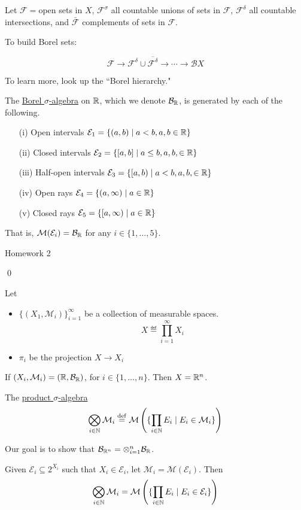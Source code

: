 \documentclass[x11names,reqno,14pt]{extarticle}
\begin{document}
Let $\mathcal{F} = $open sets in $X$, $\mathcal{F}^\sigma$ all countable unions of sets in $\mathcal{F}$, $\mathcal{F}^\delta$ all countable intersections, and $\bar{\mathcal{F}}$ complements of sets in $\mathcal{F}$. 

To build Borel sets: 

\[
\mathcal{F}\to\mathcal{F}^\delta \cup \overline{\mathcal{F}^\delta} \to\cdots \to \mathcal{B}X
\]

To learn more, look up the ``Borel hierarchy." 

\prop The \underline{Borel $\sigma$-algebra} on $\mathbb{R}$, which we denote $\mathcal{B}_{\mathbb{R}}$, is generated by each of the following. 
\begin{itemize}
\item[(i)] Open intervals $\mathcal{E}_1 = \{(a, b) \mid a < b, a, b \in \mathbb{R}\}$
\item[(ii)] Closed intervals $\mathcal{E}_2 = \{[a, b] \mid a \leq b, a,b , \in \mathbb{R}\}$
\item[(iii)] Half-open intervals $\mathcal{E}_3 = \{[a, b) \mid a < b, a, b, \in \mathbb{R}\}$
\item[(iv)] Open rays $\mathcal{E}_4 = \{(a, \infty) \mid a \in \mathbb{R}\}$
\item[(v)] Closed rays $\mathcal{E}_5 = \{[a, \infty) \mid a \in \mathbb{R}\}$
\end{itemize}

That is, $\mathcal{M}(\mathcal{E}_i) = \mathcal{B}_{\mathbb{R}}$ for any $i \in \{1, \dots, 5\}$.

\proof 

Homework 2 

\qed

Let 
\begin{itemize}
\item $\{(X_1, \mathcal{M}_i)\}_{i=1}^\infty$ be a collection of measurable spaces. 
\[
X \eqdef \prod_{i=1}^\infty X_i
\]
\item $\pi_i$ be the projection $X \to X_i$
\end{itemize}

\exm If $(X_i, \mathcal{M}_i) = (\mathbb{R}, \mathcal{B}_{\mathbb{R}})$, for $i \in \{1, \dots, n\}$. Then $X = \mathbb{R}^n$.


 The \underline{product $\sigma$-algebra}
\[
\bigotimes_{i\in\mathbb{N}} \mathcal{M}_i \overset{\mathrm{def}}{=} \mathcal{M}\left(\{\prod_{i\in\mathbb{N}} E_i \mid E_i \in \mathcal{M}_i\}\right)
\]

Our goal is to show that $\mathcal{B}_{\mathbb{R}^n} = \otimes_{i=1}^n\mathcal{B}_{\mathbb{R}}$. 

\prop Given $\mathcal{E}_i \subseteq 2^{X_i}$ such that $X_i \in \mathcal{E}_i$, let $\mathcal{M}_i = \mathcal{M}(\mathcal{E}_i)$. Then
\[
\bigotimes_{i\in\mathbb{N}} \mathcal{M}_i = \mathcal{M}\left(\{\prod_{i\in\mathbb{N}}E_i \mid E_i \in \mathcal{E}_i\}\right)
\] 
\end{document}
